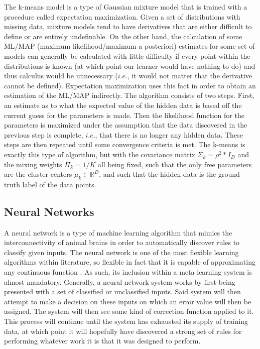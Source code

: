 The k-means model is a type of Gaussian mixture model that is trained with a
procedure called expectation maximization. Given a set of distributions with
missing data, mixture models tend to have derivatives that are either difficult
to define or are entirely undefinable. On the other hand, the calculation of some
ML/MAP (maximum likelihood/maximum a posteriori) estimates for some set of models
can generally be calculated with little difficulty if every point within the
distributions is known (at which point our learner would have nothing to do) and
thus calculus would be unnecessary ($i.e.$, it would not matter that the derivative
cannot be defined). Expectation maximization uses this fact in order to obtain an
estimation of the ML/MAP indirectly. The algorithm consists of two steps. First,
an estimate as to what the expected value of the hidden data is based off the
current guess for the parameters is made. Then the likelihood function for the
parameters is maximized under the assumption that the data discovered in the
previous step is complete, $i.e.$, that there is no longer any hidden data. These
steps are then repeated until some convergence criteria is met. The k-means is
exactly this type of algorithm, but with the covariance matrix
$\Sigma_{k} = \rho^{2}*I_{D}$ and the mixing weights $\Pi_{k} = 1/K$ all being fixed,
such that the only free parameters are the cluster centers $\mu_{k} \in \mathbb{R}^{D}$,
and such that the hidden data is the ground truth label of the data points.
\subsection{Neural Networks}
A neural network is a type of machine learning algorithm that mimics
the interconnectivity of animal brains in order to automatically
discover rules to classify given inputs. The neural network is one of the most
flexible learning algorithms within literature, so flexible in fact that it is
capable of approximating any continuous function \cite{Hornik}. As such, its
inclusion within a meta learning system is almost mandatory.  Generally,
a neural network system works by first being presented with a set of classified or
unclassified inputs. Said system will then attempt to
make a decision on these inputs on which an error value will then be
assigned. The system will then see some kind of correction function
applied to it. This process will continue until the system has
exhausted its supply of training data, at which point it will
hopefully have discovered a strong set of rules for performing whatever
work it is that it was designed to perform.

